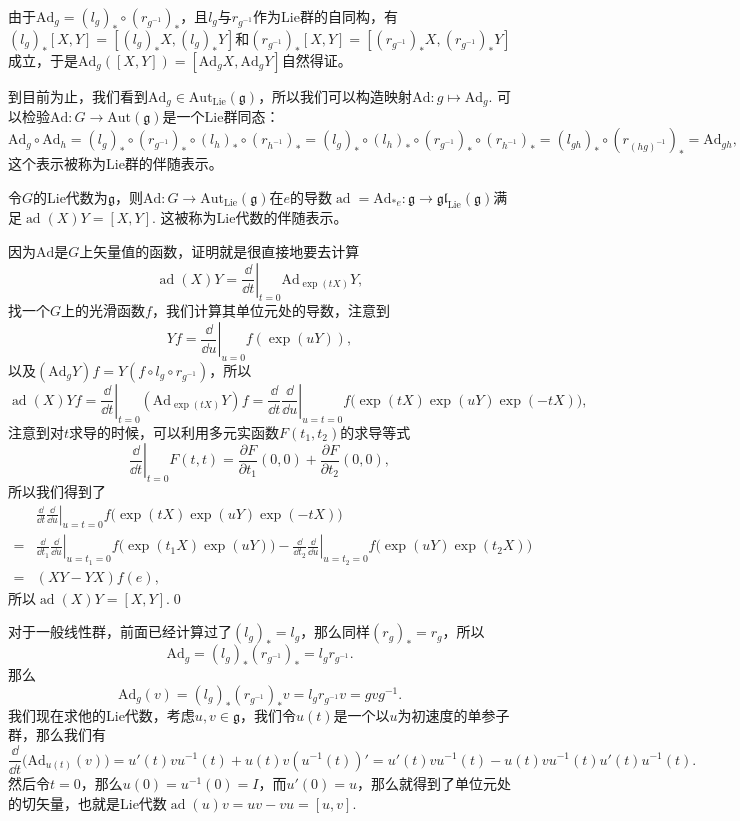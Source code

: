 \documentclass[10pt]{article}
\newcommand{\lag}{{\mathfrak{g}}}
\DeclareMathOperator{\ad}{ad}
\begin{document}
由于$\mathrm{Ad}_g=(l_g)_*\circ (r_{g^{-1}})_*$，且$l_g$与$r_{g^{-1}}$作为Lie群的自同构，有$(l_g)_*[X,Y]=[(l_g)_*X,(l_g)_*Y]$和$(r_{g^{-1}})_*[X,Y]=[(r_{g^{-1}})_*X,(r_{g^{-1}})_*Y]$成立，于是$\mathrm{Ad}_g([X,Y])=[\mathrm{Ad}_gX,\mathrm{Ad}_gY]$自然得证。

\para 到目前为止，我们看到$\mathrm{Ad}_g\in \mathrm{Aut}_{\mathrm{Lie}}(\lag)$，所以我们可以构造映射$\mathrm{Ad}:g\mapsto \mathrm{Ad}_g$. 可以检验$\mathrm{Ad}:G\to \mathrm{Aut}(\lag)$是一个Lie群同态：
\[\mathrm{Ad}_g\circ \mathrm{Ad}_h=(l_g)_*\circ (r_{g^{-1}})_*\circ (l_h)_*\circ (r_{h^{-1}})_*=(l_g)_*\circ (l_h)_*\circ (r_{g^{-1}})_*\circ (r_{h^{-1}})_*=(l_{gh})_*\circ (r_{(hg)^{-1}})_*=\mathrm{Ad}_{gh},\]
这个表示被称为Lie群的伴随表示。


\pro 令$G$的Lie代数为$\lag$，则$\mathrm{Ad}:G\to \mathrm{Aut}_{\mathrm{Lie}}(\lag)$在$e$的导数$\ad=\mathrm{Ad}_{*e}:\lag\to \mathfrak{gl}_{\mathrm{Lie}}(\lag)$满足$\ad(X)Y=[X,Y]$. 这被称为Lie代数的伴随表示。

\proof 因为$\mathrm{Ad}$是$G$上矢量值的函数，证明就是很直接地要去计算
\[
	\ad(X)Y=\left.\frac{\dd}{\dd t}\right|_{t=0}\mathrm{Ad}_{\exp(tX)}Y,
\]
找一个$G$上的光滑函数$f$，我们计算其单位元处的导数，注意到
\[
	Yf=\left.\frac{\dd}{\dd u}\right|_{u=0}f(\exp(uY)),
\]
以及$(\mathrm{Ad}_{g}Y)f=Y(f\circ l_g\circ r_{g^{-1}})$，所以
\[
	\ad(X)Yf=\left.\frac{\dd}{\dd t}\right|_{t=0}(\mathrm{Ad}_{\exp(tX)}Y)f=\left.\frac{\dd}{\dd t}\frac{\dd}{\dd u}\right|_{u=t=0}f\bigl(\exp(tX)\exp(uY)\exp(-tX)\bigr),
\]
注意到对$t$求导的时候，可以利用多元实函数$F(t_1,t_2)$的求导等式
\[
	\left.\frac{\dd}{\dd t}\right|_{t=0}F(t,t)=\frac{\partial F}{\partial t_1}(0,0)+\frac{\partial F}{\partial t_2}(0,0),
\]
所以我们得到了
\[
\begin{split}
	&\left.\frac{\dd}{\dd t}\frac{\dd}{\dd u}\right|_{u=t=0}f\bigl(\exp(tX)\exp(uY)\exp(-tX)\bigr)\\
	=&\left.\frac{\dd}{\dd t_1}\frac{\dd}{\dd u}\right|_{u=t_1=0}f\bigl(\exp(t_1X)\exp(uY)\bigr)-\left.\frac{\dd}{\dd t_2}\frac{\dd}{\dd u}\right|_{u=t_2=0}f\bigl(\exp(uY)\exp(t_2X)\bigr)\\
	=&(XY-YX)f(e),
\end{split}
\]
所以$\ad(X)Y=[X,Y]$.\qed

\para 对于一般线性群，前面已经计算过了$(l_g)_*=l_g$，那么同样$(r_g)_*=r_g$，所以
\[
	\mathrm{Ad}_g=(l_g)_*(r_{g^{-1}})_*=l_gr_{g^{-1}}.
\]
那么
\[
	\mathrm{Ad}_g(v)=(l_g)_*(r_{g^{-1}})_*v=l_gr_{g^{-1}}v=gvg^{-1}.
\]
我们现在求他的Lie代数，考虑$u,v\in \lag$，我们令$u(t)$是一个以$u$为初速度的单参子群，那么我们有
\[
	\frac{\dd}{\dd t}\bigl(\mathrm{Ad}_{u(t)}(v)\bigr)=u'(t)vu^{-1}(t)+u(t)v(u^{-1}(t))'=u'(t)vu^{-1}(t)-u(t)vu^{-1}(t)u'(t)u^{-1}(t).
\]
然后令$t=0$，那么$u(0)=u^{-1}(0)=I$，而$u'(0)=u$，那么就得到了单位元处的切矢量，也就是Lie代数$\ad(u)v=uv-vu=[u,v]$.
\end{document}

